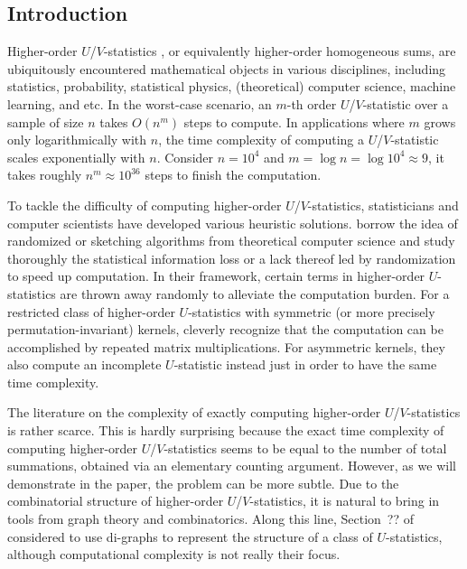 \documentclass[letterpaper,11pt]{article}
\begin{document}

\begin{bibunit}[plainnat]

\section{Introduction}
\label{sec:intro}

Higher-order $U$/$V$-statistics \citep{de2012decoupling}, or equivalently higher-order homogeneous sums, are ubiquitously encountered mathematical objects in various disciplines, including statistics, probability, statistical physics, (theoretical) computer science, machine learning, and etc. In the worst-case scenario, an $m$-th order $U$/$V$-statistic over a sample of size $n$ takes $O (n^{m})$ steps to compute. In applications where $m$ grows only logarithmically with $n$, the time complexity of computing a $U$/$V$-statistic scales exponentially with $n$. Consider $n = 10^{4}$ and $m = \log n = \log 10^{4} \approx 9$, it takes roughly $n^{m} \approx 10^{36}$ steps to finish the computation.

To tackle the difficulty of computing higher-order $U$/$V$-statistics, statisticians and computer scientists have developed various heuristic solutions. \citet{chen2019randomized} borrow the idea of randomized or sketching algorithms from theoretical computer science \citep{mahoney2011randomized, woodruff2014sketching} and study thoroughly the statistical information loss or a lack thereof led by randomization to speed up computation. In their framework, certain terms in higher-order $U$-statistics are thrown away randomly to alleviate the computation burden. For a restricted class of higher-order $U$-statistics with symmetric (or more precisely permutation-invariant) kernels, \citet{kong2018estimating} cleverly recognize that the computation can be accomplished by repeated matrix multiplications. For asymmetric kernels, they also compute an incomplete $U$-statistic instead just in order to have the same time complexity.

The literature on the complexity of exactly computing higher-order $U$/$V$-statistics is rather scarce. This is hardly surprising because the exact time complexity of computing higher-order $U$/$V$-statistics seems to be equal to the number of total summations, obtained via an elementary counting argument. However, as we will demonstrate in the paper, the problem can be more subtle. Due to the combinatorial structure of higher-order $U$/$V$-statistics, it is natural to bring in tools from graph theory and combinatorics. Along this line, Section~?? of \citet{liu2024hypothesis} considered to use di-graphs to represent the structure of a class of $U$-statistics, although computational complexity is not really their focus.


\end{bibunit}
\end{document}
